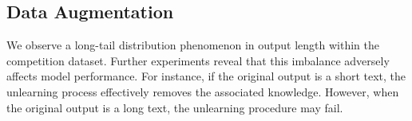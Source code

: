 \documentclass[11pt]{article}
\begin{document}
\subsection{Data Augmentation} 
\label{sec:DA}


We observe a long-tail distribution phenomenon in output length within the competition dataset. Further experiments reveal that this imbalance adversely affects model performance. For instance, if the original output is a short text, the unlearning process effectively removes the associated knowledge. However, when the original output is a long text, the unlearning procedure may fail.

\end{document}
